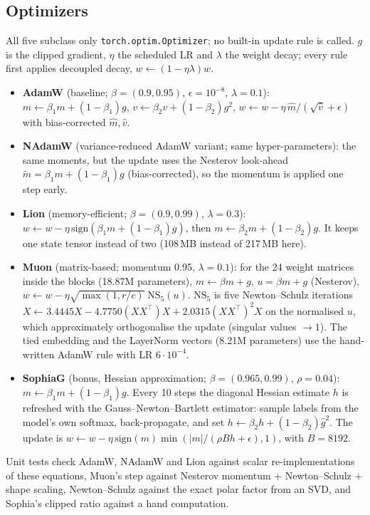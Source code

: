 \documentclass[11pt,a4paper]{article}
\begin{document}
\subsection{Optimizers}
All five subclass only \texttt{torch.optim.Optimizer}; no built-in update rule is called. $g$ is the clipped gradient, $\eta$ the scheduled LR and $\lambda$ the weight decay; every rule first applies decoupled decay, $w\leftarrow(1-\eta\lambda)w$.
\begin{itemize}
\item \textbf{AdamW} (baseline; $\beta=(0.9,0.95)$, $\epsilon=10^{-8}$, $\lambda=0.1$): $m\leftarrow\beta_1m+(1-\beta_1)g$, $v\leftarrow\beta_2v+(1-\beta_2)g^2$, $w\leftarrow w-\eta\,\hat m/(\sqrt{\hat v}+\epsilon)$ with bias-corrected $\hat m,\hat v$.
\item \textbf{NAdamW} (variance-reduced AdamW variant; same hyper-parameters): the same moments, but the update uses the Nesterov look-ahead $\tilde m=\beta_1m+(1-\beta_1)g$ (bias-corrected), so the momentum is applied one step early.
\item \textbf{Lion} (memory-efficient; $\beta=(0.9,0.99)$, $\lambda=0.3$): $w\leftarrow w-\eta\,\mathrm{sign}(\beta_1m+(1-\beta_1)g)$, then $m\leftarrow\beta_2m+(1-\beta_2)g$. It keeps one state tensor instead of two (108\,MB instead of 217\,MB here).
\item \textbf{Muon} (matrix-based; momentum 0.95, $\lambda=0.1$): for the 24 weight matrices inside the blocks (18.87M parameters), $m\leftarrow\beta m+g$, $u=\beta m+g$ (Nesterov), $w\leftarrow w-\eta\sqrt{\max(1,r/c)}\;\mathrm{NS}_5(u)$. $\mathrm{NS}_5$ is five Newton--Schulz iterations $X\leftarrow3.4445X-4.7750(XX^\top)X+2.0315(XX^\top)^2X$ on the normalised $u$, which approximately orthogonalise the update (singular values $\to1$). The tied embedding and the LayerNorm vectors (8.21M parameters) use the hand-written AdamW rule with LR $6\cdot10^{-4}$.
\item \textbf{SophiaG} (bonus, Hessian approximation; $\beta=(0.965,0.99)$, $\rho=0.04$): $m\leftarrow\beta_1m+(1-\beta_1)g$. Every 10 steps the diagonal Hessian estimate $h$ is refreshed with the Gauss--Newton--Bartlett estimator: sample labels from the model's own softmax, back-propagate, and set $h\leftarrow\beta_2h+(1-\beta_2)\hat g^2$. The update is $w\leftarrow w-\eta\,\mathrm{sign}(m)\min(|m|/(\rho Bh+\epsilon),1)$, with $B=8192$.
\end{itemize}
Unit tests check AdamW, NAdamW and Lion against scalar re-implementations of these equations, Muon's step against Nesterov momentum + Newton--Schulz + shape scaling, Newton--Schulz against the exact polar factor from an SVD, and Sophia's clipped ratio against a hand computation.
\end{document}
